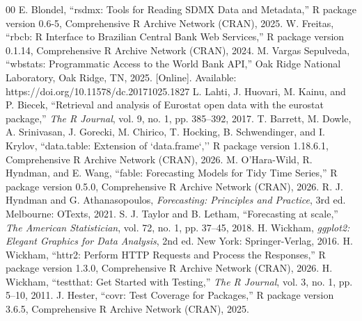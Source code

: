 \documentclass[conference]{IEEEtran}
\begin{document}
\begin{thebibliography}{00}
 E. Blondel, ``rsdmx: Tools for Reading SDMX Data and Metadata,'' R package version 0.6-5, Comprehensive R Archive Network (CRAN), 2025.
 W. Freitas, ``rbcb: R Interface to Brazilian Central Bank Web Services,'' R package version 0.1.14, Comprehensive R Archive Network (CRAN), 2024.
 M. Vargas Sepulveda, ``wbstats: Programmatic Access to the World Bank API,'' Oak Ridge National Laboratory, Oak Ridge, TN, 2025. [Online]. Available: https://doi.org/10.11578/dc.20171025.1827
 L. Lahti, J. Huovari, M. Kainu, and P. Biecek, ``Retrieval and analysis of Eurostat open data with the eurostat package,'' \emph{The R Journal}, vol. 9, no. 1, pp. 385--392, 2017.
 T. Barrett, M. Dowle, A. Srinivasan, J. Gorecki, M. Chirico, T. Hocking, B. Schwendinger, and I. Krylov, ``data.table: Extension of `data.frame`,'' R package version 1.18.6.1, Comprehensive R Archive Network (CRAN), 2026.
 M. O'Hara-Wild, R. Hyndman, and E. Wang, ``fable: Forecasting Models for Tidy Time Series,'' R package version 0.5.0, Comprehensive R Archive Network (CRAN), 2026.
 R. J. Hyndman and G. Athanasopoulos, \emph{Forecasting: Principles and Practice}, 3rd ed. Melbourne: OTexts, 2021.
 S. J. Taylor and B. Letham, ``Forecasting at scale,'' \emph{The American Statistician}, vol. 72, no. 1, pp. 37--45, 2018.
 H. Wickham, \emph{ggplot2: Elegant Graphics for Data Analysis}, 2nd ed. New York: Springer-Verlag, 2016.
 H. Wickham, ``httr2: Perform HTTP Requests and Process the Responses,'' R package version 1.3.0, Comprehensive R Archive Network (CRAN), 2026.
 H. Wickham, ``testthat: Get Started with Testing,'' \emph{The R Journal}, vol. 3, no. 1, pp. 5--10, 2011.
 J. Hester, ``covr: Test Coverage for Packages,'' R package version 3.6.5, Comprehensive R Archive Network (CRAN), 2025.
\end{thebibliography}
\end{document}
